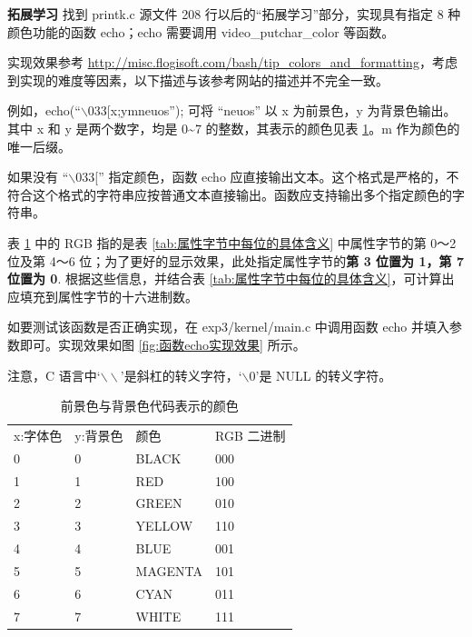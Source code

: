 \begin{mdframed}[hidealllines=true,backgroundcolor=gray!20]
\textbf{拓展学习 }找到 printk.c 源文件 208 行以后的“拓展学习”部分，实现具有指定 8 种颜色功能的函数 echo；echo 需要调用 video\_putchar\_color 等函数。

实现效果参考 \url{http://misc.flogisoft.com/bash/tip_colors_and_formatting}，考虑到实现的难度等因素，以下描述与该参考网站的描述并不完全一致。

例如，echo(“$\backslash$033[x;ymneuos”); 可将 “neuos” 以 x 为前景色，y 为背景色输出。其中 x 和 y 是两个数字，均是 0\textasciitilde7 的整数，其表示的颜色见表 \ref{tab:前景色与背景色代码表示的颜色}。m 作为颜色的唯一后缀。

如果没有 “$\backslash$033[” 指定颜色，函数 echo 应直接输出文本。这个格式是严格的，不符合这个格式的字符串应按普通文本直接输出。函数应支持输出多个指定颜色的字符串。

表 \ref{tab:前景色与背景色代码表示的颜色} 中的 RGB 指的是表 \ref{tab:属性字节中每位的具体含义} 中属性字节的第 0～2 位及第 4～6 位；为了更好的显示效果，此处指定属性字节的\textbf{第 3 位置为 1，第 7 位置为 0}. 根据这些信息，并结合表 \ref{tab:属性字节中每位的具体含义}，可计算出应填充到属性字节的十六进制数。

如要测试该函数是否正确实现，在 exp3/kernel/main.c 中调用函数 echo 并填入参数即可。实现效果如图 \ref{fig:函数echo实现效果} 所示。

注意，C 语言中‘$\backslash\backslash$’是斜杠的转义字符，‘$\backslash$0’是 NULL 的转义字符。

\end{mdframed}

\begin{table}[]
\caption{前景色与背景色代码表示的颜色}
\label{tab:前景色与背景色代码表示的颜色}
\begin{tabular}{llll}
x:字体色 & y:背景色 & 颜色 & RGB 二进制 \\
0 & 0 & BLACK & 000 \\
1 & 1 & RED & 100 \\
2 & 2 & GREEN & 010 \\
3 & 3 & YELLOW & 110 \\
4 & 4 & BLUE & 001 \\
5 & 5 & MAGENTA & 101 \\
6 & 6 & CYAN & 011 \\
7 & 7 & WHITE & 111
\end{tabular}
\end{table}

